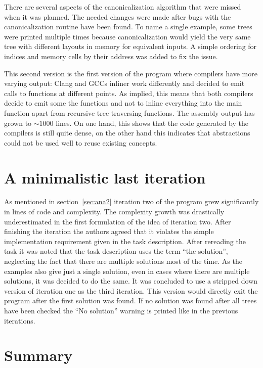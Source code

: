 \documentclass[11pt,a4paper]{article}
\begin{document}
There are several aspects of the canonicalization algorithm that were
missed when it was planned.
The needed changes were made after bugs with the canonicalization
routine have been found.
To name a single example, some trees were printed multiple times
because canonicalization would yield the very same tree with different
layouts in memory for equivalent inputs.
A simple ordering for indices and memory cells by their address was
added to fix the issue.

This second version is the first version of the program where
compilers have more varying output: Clang and GCCs inliner work
differently and decided to emit calls to functions at different
points. As implied, this means that both compilers decide to
emit some the functions and not to inline everything into the main
function apart from recursive tree traversing functions.
The assembly output has grown to $\sim 1000$ lines. On one hand, this
shows that the code generated by the compilers is still quite dense,
on the other hand this indicates that abstractions could not be used
well to reuse existing concepts.

\section {A minimalistic last iteration}

As mentioned in section~\ref{sec:ana2} iteration two of the program
grew significantly in lines of code and complexity.
The complexity growth was drastically underestimated in the first
formulation of the idea of iteration two.
After finishing the iteration the authors agreed that it violates the
simple implementation requirement given in the task description.
After rereading the task it was noted that the task description uses
the term ``the solution'', neglecting the fact that there are multiple
solutions most of the time.
As the examples also give just a single solution, even in cases where
there are multiple solutions, it was decided to do the same.
It was concluded to use a stripped down version of iteration one as
the third iteration.
This version would directly exit the program after the first solution
was found.
If no solution was found after all trees have been checked the ``No
solution'' warning is printed like in the previous iterations.

\section{Summary}
\end{document}
